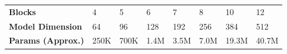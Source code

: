 \begin{tabular}{llllllll}
\hline
\textbf{Blocks} & 4 & 5 & 6 & 7 & 8 & 10 & 12 \\
\textbf{Model Dimension} & 64 & 96 & 128 & 192 & 256 & 384 & 512 \\
\textbf{Params (Approx.)} & 250K & 700K & 1.4M & 3.5M & 7.0M & 19.3M & 40.7M \\
\hline
\end{tabular}
